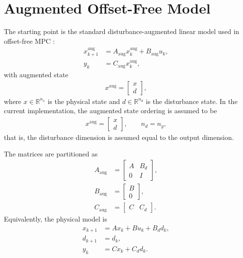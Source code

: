 \documentclass[11pt]{article}
\newcommand{\R}{\mathbb{R}}
\newcommand{\xaug}{x^{\mathrm{aug}}}
\begin{document}
\section{Augmented Offset-Free Model}
The starting point is the standard disturbance-augmented linear model used in
offset-free MPC \cite{PannocchiaRawlings2003,PannocchiaBemporad2007}:
\begin{align}
    \xaug_{k+1} &= A_{\mathrm{aug}} \xaug_k + B_{\mathrm{aug}} u_k, \\
    y_k &= C_{\mathrm{aug}} \xaug_k,
\end{align}
with augmented state
\begin{align}
    \xaug = \begin{bmatrix} x \\ d \end{bmatrix},
\end{align}
where $x \in \R^{n_x}$ is the physical state and $d \in \R^{n_d}$ is the
disturbance state. In the current implementation, the augmented state ordering
is assumed to be
\begin{align}
    \xaug = \begin{bmatrix} x \\ d \end{bmatrix},
    \qquad n_d = n_y,
\end{align}
that is, the disturbance dimension is assumed equal to the output dimension.

The matrices are partitioned as
\begin{align}
    A_{\mathrm{aug}} &=
    \begin{bmatrix}
        A & B_d \\
        0 & I
    \end{bmatrix}, \\
    B_{\mathrm{aug}} &=
    \begin{bmatrix}
        B \\
        0
    \end{bmatrix}, \\
    C_{\mathrm{aug}} &=
    \begin{bmatrix}
        C & C_d
    \end{bmatrix}.
\end{align}
Equivalently, the physical model is
\begin{align}
    x_{k+1} &= A x_k + B u_k + B_d d_k, \\
    d_{k+1} &= d_k, \\
    y_k &= C x_k + C_d d_k.
\end{align}
\end{document}
